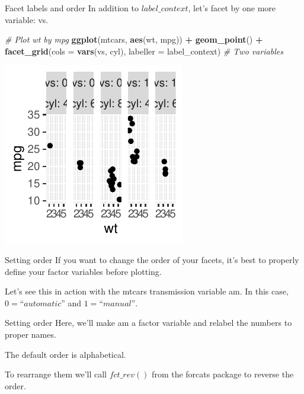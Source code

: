 \documentclass[
  ignorenonframetext,
]{beamer}
\newenvironment{Shaded}{\begin{snugshade}}{\end{snugshade}}
\newcommand{\AttributeTok}[1]{\textcolor[rgb]{0.13,0.29,0.53}{#1}}
\newcommand{\CommentTok}[1]{\textcolor[rgb]{0.56,0.35,0.01}{\textit{#1}}}
\newcommand{\FunctionTok}[1]{\textcolor[rgb]{0.13,0.29,0.53}{\textbf{#1}}}
\newcommand{\NormalTok}[1]{#1}
\newcommand{\SpecialCharTok}[1]{\textcolor[rgb]{0.81,0.36,0.00}{\textbf{#1}}}
\begin{document}
\begin{frame}[fragile]{Facet labels and order}
\label{facet-labels-and-order-6}
In addition to \(label\_context\), let's facet by one more variable: vs.


\begin{Shaded}
\begin{Highlighting}[]
\CommentTok{\# Plot wt by mpg}
\FunctionTok{ggplot}\NormalTok{(mtcars, }\FunctionTok{aes}\NormalTok{(wt, mpg)) }\SpecialCharTok{+} \FunctionTok{geom\_point}\NormalTok{() }\SpecialCharTok{+} \FunctionTok{facet\_grid}\NormalTok{(}\AttributeTok{cols =} \FunctionTok{vars}\NormalTok{(vs,}
\NormalTok{    cyl), }\AttributeTok{labeller =}\NormalTok{ label\_context)  }\CommentTok{\# Two variables}
\end{Highlighting}
\end{Shaded}

\begin{center}\includegraphics[width=0.5\linewidth]{Figs/unnamed-chunk-85-1} \end{center}
\end{frame}

\begin{frame}{Setting order}
\label{setting-order}
If you want to change the order of your facets, it's best to properly
define your factor variables before plotting.

Let's see this in action with the mtcars transmission variable am. In
this case, \(0 = “automatic”\) and \(1 = “manual”\).
\end{frame}

\begin{frame}{Setting order}
\label{setting-order-1}
Here, we'll make am a factor variable and relabel the numbers to proper
names.

The default order is alphabetical.

To rearrange them we'll call \(fct\_rev()\) from the forcats package to
reverse the order.
\end{frame}
\end{document}
